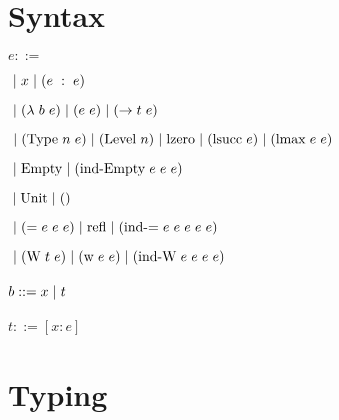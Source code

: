 \documentclass{article}
\begin{document}
\newcommand{\spc}[0]{\hspace{0.3em}}
\newcommand{\pipe}[0]{\spc | \spc}

\newcommand{\ann}[2]{(#1 \spc : \spc #2)}
\newcommand{\lam}[2]{(\lambda \spc #1 \spc #2)}
\newcommand{\app}[2]{(#1 \spc #2)}
\newcommand{\arr}[2]{(\to #1 \spc #2)}
\newcommand{\Type}[2]{(\text{Type} \spc #1 \spc #2)}
\newcommand{\Level}[1]{(\text{Level} \spc #1)}
\newcommand{\lzero}[0]{\text{lzero}}
\newcommand{\lsucc}[1]{(\text{lsucc} \spc #1)}
\newcommand{\lmax}[2]{(\text{lmax} \spc #1 \spc #2)}
\newcommand{\Empty}[0]{\text{Empty}}
\newcommand{\IndEmpty}[3]{(\text{ind-Empty} \spc #1 \spc #2 \spc #3)}
\newcommand{\UnitT}[0]{\text{Unit}}
\newcommand{\Unit}[0]{()}
\newcommand{\Eq}[3]{(\text{=} \spc #1 \spc #2 \spc #3)}
\newcommand{\Refl}[0]{\text{refl}}
\newcommand{\IndEq}[5]{(\text{ind-=} \spc #1 \spc #2 \spc #3 \spc #4 \spc #5)}
\newcommand{\W}[2]{(\text{W} \spc #1 \spc #2)}
\newcommand{\w}[2]{(\text{w} \spc #1 \spc #2)}
\newcommand{\IndW}[4]{(\text{ind-W} \spc #1 \spc #2 \spc #3 \spc #4)}

\newcommand{\synthR}[3]{#1 \vdash #2 \Rightarrow #3}
\newcommand{\checkR}[3]{#1 \vdash #2 \Leftarrow #3}
\newcommand{\subst}[3]{#1 [#2/#3]}
\newcommand{\tmax}[4]{\text{tmax}(#1, #2, #3, #4)}

\section{Syntax}

$e ::=$

$\pipe x \pipe \ann{e}{e}$

$\pipe \lam{b}{e} \pipe \app{e}{e} \pipe \arr{t}{e}$

$\pipe \Type{n}{e} \pipe \Level{n} \pipe \lzero \pipe \lsucc{e} \pipe \lmax{e}{e}$

$\pipe \Empty \pipe \IndEmpty{e}{e}{e}$

$\pipe \UnitT \pipe \Unit$

$\pipe \Eq{e}{e}{e} \pipe \Refl \pipe \IndEq{e}{e}{e}{e}{e}$

$\pipe \W{t}{e} \pipe \w{e}{e} \pipe \IndW{e}{e}{e}{e}$
\\\\
$b ::= x \pipe t$
\\\\
$t ::= [x : e]$

\section{Typing}
\end{document}
